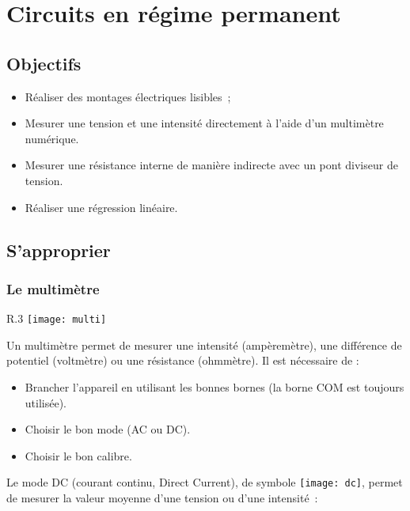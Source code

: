 \documentclass[a4paper, 11pt, final, garamond]{book}
\begin{document}
\setcounter{chapter}{4}

\chapter{Circuits en r\'egime permanent}

\section{Objectifs}

\begin{itemize}
    \item Réaliser des montages électriques lisibles~;
    \item Mesurer une tension et une intensité directement à l’aide d’un
        multimètre numérique.
    \item Mesurer une résistance interne de manière indirecte avec un pont
        diviseur de tension.
    \item Réaliser une régression linéaire.
\end{itemize}

\section{S'approprier}
\subsection{Le multimètre}

\begin{wrapfigure}[20]{R}{.3\linewidth}
    \vspace*{-20pt}
    \centering
    \texttt{[image: multi]}
\end{wrapfigure}
Un multimètre permet de mesurer une intensité (ampèremètre), une différence de
potentiel (voltmètre) ou une résistance (ohmmètre). Il est nécessaire de :
\begin{itemize}
    \item Brancher l’appareil en utilisant les bonnes bornes (la borne COM est
        toujours utilisée).
    \item Choisir le bon mode (AC ou DC).
    \item Choisir le bon calibre.
\end{itemize}


Le mode DC (courant continu, Direct Current), de symbole
\texttt{[image: dc]}, permet de mesurer la valeur moyenne d’une
tension ou d’une intensité~: 
\end{document}
